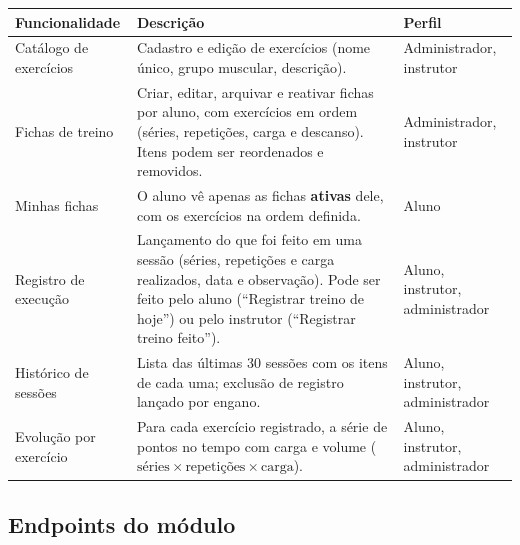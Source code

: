 \documentclass[11pt,a4paper,final]{article}
\begin{document}
\begin{xltabular}{\textwidth}{R{3.6cm} Y R{3.2cm}}
  \toprule
  \textbf{Funcionalidade} & \textbf{Descrição} & \textbf{Perfil} \\
  \midrule
  \endhead
  Catálogo de exercícios & Cadastro e edição de exercícios (nome único, grupo muscular, descrição). & Administrador, instrutor \\
  Fichas de treino & Criar, editar, arquivar e reativar fichas por aluno, com exercícios em ordem (séries, repetições, carga e descanso). Itens podem ser reordenados e removidos. & Administrador, instrutor \\
  Minhas fichas & O aluno vê apenas as fichas \textbf{ativas} dele, com os exercícios na ordem definida. & Aluno \\
  Registro de execução & Lançamento do que foi feito em uma sessão (séries, repetições e carga realizados, data e observação). Pode ser feito pelo aluno (``Registrar treino de hoje'') ou pelo instrutor (``Registrar treino feito''). & Aluno, instrutor, administrador \\
  Histórico de sessões & Lista das últimas 30 sessões com os itens de cada uma; exclusão de registro lançado por engano. & Aluno, instrutor, administrador \\
  Evolução por exercício & Para cada exercício registrado, a série de pontos no tempo com carga e volume ($\text{séries}\times\text{repetições}\times\text{carga}$). & Aluno, instrutor, administrador \\
  \bottomrule
\end{xltabular}

\subsection{Endpoints do módulo}
\end{document}
